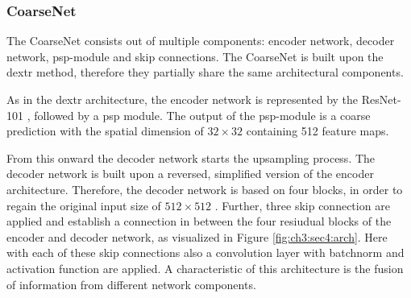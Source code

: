 \subsubsection{CoarseNet}
The CoarseNet consists out of multiple components: encoder network, decoder network, \gls{psp}-module and skip connections. The CoarseNet is built upon the \gls{dextr} method, therefore they partially share the same architectural components.

As in the \gls{dextr} architecture, the encoder network is represented by the ResNet-101 \cite{He16-ResNet}, followed by a \gls{psp} module.
The output of the \gls{psp}-module is a coarse prediction with the spatial dimension of  $32 \times 32$  containing 512 feature maps. 

From this onward the decoder network starts the upsampling process.
The decoder network is built upon a reversed, simplified version of the encoder architecture. %
Therefore, the decoder network is based on four blocks, in order to regain the original input size of  $512 \times 512$ .
Further, three skip connection are applied and establish a connection in between the four resiudual blocks of the encoder and decoder network, as visualized in Figure \ref{fig:ch3:sec4:arch}.
Here with each of these skip connections also a convolution layer with batchnorm \cite{SS15-Batchnorm} and activation function are applied.
A characteristic of this architecture is the fusion of information from different network components.

